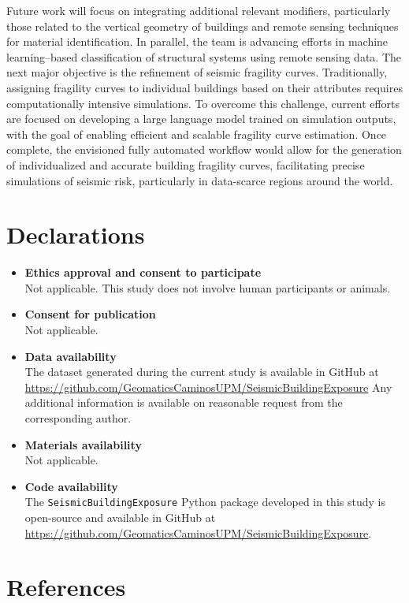 \begin{refsection}
Future work will focus on integrating additional relevant modifiers, particularly those related to the vertical geometry of buildings and remote sensing techniques for material identification. In parallel, the team is advancing efforts in machine learning–based classification of structural systems using remote sensing data. The next major objective is the refinement of seismic fragility curves. Traditionally, assigning fragility curves to individual buildings based on their attributes requires computationally intensive simulations. To overcome this challenge, current efforts are focused on developing a large language model trained on simulation outputs, with the goal of enabling efficient and scalable fragility curve estimation. Once complete, the envisioned fully automated workflow would allow for the generation of individualized and accurate building fragility curves, facilitating precise simulations of seismic risk, particularly in data-scarce regions around the world.

\section*{Declarations}

\begin{itemize}
\item \textbf{Ethics approval and consent to participate} \\
Not applicable. This study does not involve human participants or animals.

\item \textbf{Consent for publication} \\
Not applicable.

\item \textbf{Data availability} \\
The dataset generated during the current study is available in GitHub at \url{https://github.com/GeomaticsCaminosUPM/SeismicBuildingExposure}
Any additional information is available on reasonable request from the corresponding author.

\item \textbf{Materials availability} \\
Not applicable.

\item \textbf{Code availability} \\
The \texttt{SeismicBuildingExposure} Python package developed in this study is open-source and available in GitHub at \url{https://github.com/GeomaticsCaminosUPM/SeismicBuildingExposure}.
\end{itemize}

\newpage

\renewcommand{\sectionnametext}{References}
\renewcommand{\headingtextR}{\thesection. \sectionnametext}
\section{\sectionnametext}

\printbibliography[heading=none]
\end{refsection}